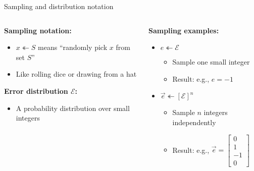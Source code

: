 \documentclass[aspectratio=169, lualatex, handout]{beamer}
\begin{document}
\begin{frame}{Sampling and distribution notation}
	\begin{columns}[c]
		\begin{column}{0.5\textwidth}
			\textbf{Sampling notation:}
			\begin{itemize}
				\item $x \twoheadleftarrow S$ means ``randomly pick $x$ from set $S$''
				\item Like rolling dice or drawing from a hat
			\end{itemize}
			\vspace{3mm}
			\textbf{Error distribution $\mathcal{E}$:}
			\begin{itemize}
				\item A probability distribution over small integers
			\end{itemize}
		\end{column}
		\begin{column}{0.5\textwidth}
			\textbf{Sampling examples:}
			\begin{itemize}
				\item $e \twoheadleftarrow \mathcal{E}$
				      \begin{itemize}
					      \item Sample one small integer
					      \item Result: e.g., $e = -1$
				      \end{itemize}
				\item $\vec{e} \twoheadleftarrow [\mathcal{E}]^n$
				      \begin{itemize}
					      \item Sample $n$ integers independently
					      \item Result: e.g., $\vec{e} = \begin{bmatrix} 0 \\ 1 \\ -1 \\ 0 \end{bmatrix}$
				      \end{itemize}
			\end{itemize}
		\end{column}
	\end{columns}
\end{frame}
\end{document}
